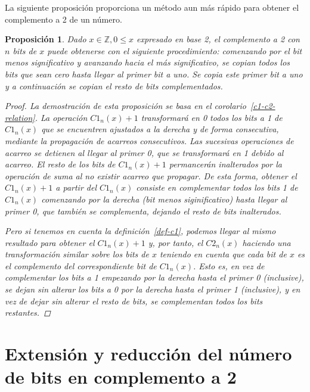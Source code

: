 \documentclass[spanish,a4paper,12pt,titlepage]{article}
\newtheorem{proposition}[theorem]{Proposición}
\theoremstyle{definition}
\theoremstyle{remark}
\newcommand{\bbZ}{\mathbb{Z}}
\begin{document}
La siguiente proposición proporciona un método aun más rápido para obtener el complemento a 2 de un número.

\begin{proposition}
    Dado $x \in \bbZ, 0 \le x$ expresado en base 2, el complemento a 2 con $n$ bits de $x$ puede obtenerse con el siguiente procedimiento: comenzando por el bit menos significativo y avanzando hacia el más significativo, se copian todos los bits que sean cero hasta llegar al primer bit a uno. Se copia este primer bit a uno y a continuación se copian el resto de bits complementados.
    \begin{proof}
        La demostración de esta proposición se basa en el corolario~\ref{c1-c2-relation}. La operación $C1_n(x)+1$ transformará en 0 todos los bits a 1 de $C1_n(x)$ que se encuentren ajustados a la derecha y de forma consecutiva, mediante la propagación de acarreos consecutivos. Las sucesivas operaciones de acarreo se detienen al llegar al primer 0, que se transformará en 1 debido al acarreo. El resto de los bits de $C1_n(x)+1$ permancerán inalterados por la operación de suma al no existir acarreo que propagar. De esta forma, obtener el $C1_n(x)+1$ a partir del $C1_n(x)$ consiste en complementar todos los bits 1 de $C1_n(x)$ comenzando por la derecha (bit menos siginificativo) hasta llegar al primer 0, que también se complementa, dejando el resto de bits inalterados.

        Pero si tenemos en cuenta la definición~\ref{def-c1}, podemos llegar al mismo resultado para obtener el $C1_n(x)+1$ y, por tanto, el $C2_n(x)$ haciendo una transformación similar sobre los bits de $x$ teniendo en cuenta que cada bit de $x$ es el complemento del correspondiente bit de $C1_n(x)$. Esto es, en vez de complementar los bits a 1 empezando por la derecha hasta el primer 0 (inclusive), se dejan sin alterar los bits a 0 por la derecha hasta el primer 1 (inclusive), y en vez de dejar sin alterar el resto de bits, se complementan todos los bits restantes.
    \end{proof}
\end{proposition}

\section{Extensión y reducción del número de bits en complemento a 2}
\end{document}
